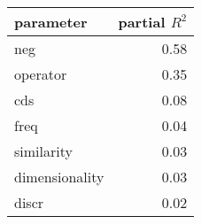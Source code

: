 \begin{tabular}{lr}
\toprule
      parameter &  partial $R^2$ \\
\midrule
            neg &       0.58 \\
       operator &       0.35 \\
            cds &       0.08 \\
           freq &       0.04 \\
     similarity &       0.03 \\
 dimensionality &       0.03 \\
          discr &       0.02 \\
\bottomrule
\end{tabular}
